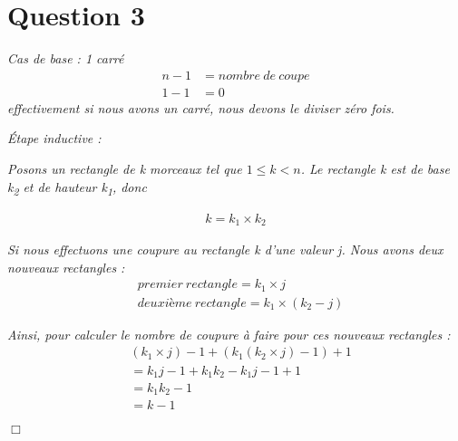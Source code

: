 \section*{Question 3}
\noindent
\emph{Cas de base : 1 carré }
\begin{align*}
	n - 1 &= nombre\ de\ coupe\\
	1 - 1 &= 0
\end{align*}
\noindent
\emph{effectivement si nous avons un carré, nous devons le diviser zéro fois.}

\bigskip
\noindent
\emph{Étape inductive : }

\noindent
\emph{Posons un rectangle de k morceaux tel que $ 1 \leq k < n$. Le rectangle k est de base k\textsubscript{2} et de hauteur k\textsubscript{1}, donc}

\begin{align*}
k = k_1 \times k_2
\end{align*}

\noindent
\emph{Si nous effectuons une coupure au rectangle k d'une valeur j. Nous avons deux nouveaux rectangles :}
\begin{align*}
&premier\ rectangle = k_1 \times j\\
&deuxième\ rectangle = k_1 \times (k_2 - j)
\end{align*}

\noindent
\emph{Ainsi, pour calculer le nombre de coupure à faire pour ces nouveaux rectangles : }
\begin{align*}
&(k_1 \times j) - 1 + (k_1(k_2 \times j)-1) + 1\\
&= k_1 j - 1 + k_1 k_2 - k_1 j - 1 + 1\\
&= k_1 k_2 - 1\\
&= k - 1
\end{align*}
\begin{flushright}
	$\Box$
\end{flushright}